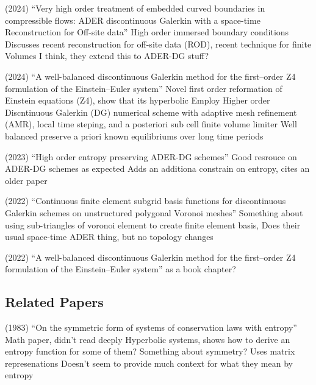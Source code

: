 \begin{outline}
  \1 (2024) ``Very high order treatment of embedded curved boundaries in compressible flows: ADER discontinuous Galerkin with a space-time Reconstruction for Off-site data'' \cite{ciallella2024very}
  \2 High order immersed boundary conditions
  \2 Discusses recent reconstruction for off-site data (ROD), recent technique for finite Volumes
  \2 I think, they extend this to ADER-DG stuff?

  \1 (2024) ``A well-balanced discontinuous Galerkin method for the first--order Z4 formulation of the Einstein--Euler system'' \cite{dumbser2024well}
  \2 Novel first order reformation of Einstein equations (Z4), show that its hyperbolic
  \2 Employ Higher order Discntinuous Galerkin (DG) numerical scheme with adaptive mesh refinement (AMR), local time steping, and a posteriori sub cell finite volume limiter
  \2 Well balanced preserve a priori known equilibriums over long time periods

  \1 (2023) ``High order entropy preserving ADER-DG schemes'' \cite{gaburro2023high}
  \2 Good resrouce on ADER-DG schemes as expected
  \2 Adds an additiona constrain on entropy, cites an older paper \cite{harten1982symmetric} 

  \1 (2022) ``Continuous finite element subgrid basis functions for discontinuous Galerkin schemes on unstructured polygonal Voronoi meshes'' \cite{boscheri2022continuous}
  \2 Something about using sub-triangles of voronoi element to create finite element basis,
  \2 Does their usual space-time ADER thing, but no topology changes

  \1 (2022) ``A well-balanced discontinuous Galerkin method for the first--order Z4 formulation of the Einstein--Euler system'' \cite{Gaburro2021High}
  \2 \cite{Gaburro2020High} as a book chapter?


\end{outline}

\subsection{Related Papers}

\begin{outline}
  \1 (1983) ``On the symmetric form of systems of conservation laws with entropy'' \cite{harten1983symmetric}
  \2 Math paper, didn't read deeply
  \2 Hyperbolic systems, shows how to derive an entropy function for some of them? Something about symmetry? Uses matrix represenations
  \2 Doesn't seem to provide much context for what they mean by entropy
\end{outline}


